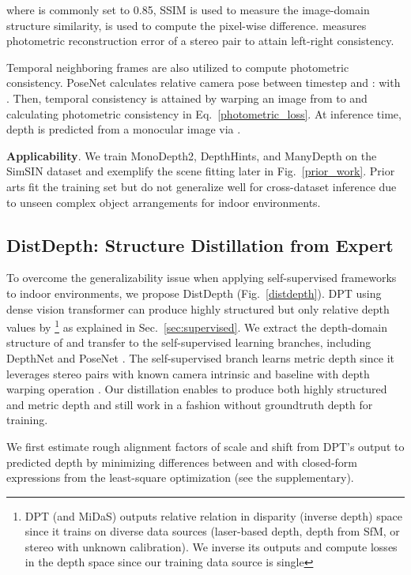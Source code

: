 \documentclass[10pt,twocolumn,letterpaper]{article}
\begin{document}
where  is commonly set to 0.85, SSIM \cite{wang2004image} is used to measure the image-domain structure similarity,  is used to compute the pixel-wise difference.  measures photometric reconstruction error of a stereo pair to attain left-right consistency.

Temporal neighboring frames are also utilized to compute photometric consistency. PoseNet calculates relative camera pose between timestep  and :  with . Then, temporal consistency is attained by warping an image from  to  and calculating photometric consistency in Eq.~\ref{photometric_loss}. At inference time, depth is predicted from a monocular image via .

\textbf{Applicability}. We train MonoDepth2, DepthHints, and ManyDepth on the SimSIN dataset and exemplify the scene fitting later in Fig.~\ref{prior_work}. Prior arts fit the training set but do not generalize well for cross-dataset inference due to unseen complex object arrangements for indoor environments.

\subsection{DistDepth: Structure Distillation from Expert}
\label{sec:distdepth}
To overcome the generalizability issue when applying self-supervised frameworks to indoor environments, we propose DistDepth (Fig.~\ref{distdepth}). DPT \cite{Ranftl2021} using dense vision transformer can produce highly structured but only relative depth values by \footnote{DPT (and MiDaS) outputs relative relation in disparity (inverse depth) space since it trains on diverse data sources (laser-based depth, depth from SfM, or stereo with unknown calibration). We inverse its outputs and compute losses in the depth space since our training data source is single} as explained in Sec.~\ref{sec:supervised}. We extract the depth-domain structure of  and transfer to the self-supervised learning branches, including DepthNet  and PoseNet . The self-supervised branch learns metric depth since it leverages stereo pairs with known camera intrinsic and baseline with depth warping operation . Our distillation enables  to produce both highly structured and metric depth and still work in a fashion without groundtruth depth for training.  

We first estimate rough alignment factors of scale  and shift  from DPT's output  to predicted depth  by minimizing differences between  and  with closed-form expressions from the least-square optimization (see the supplementary).
\end{document}
